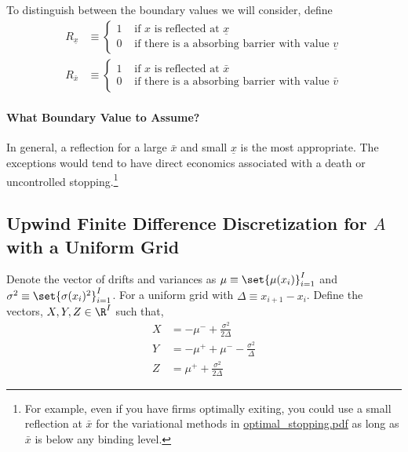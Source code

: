 \documentclass[11pt]{etk-article}
\begin{document}
To distinguish between the boundary values we will consider, define
\begin{align}
	R_{\underline{x}} &\equiv \begin{cases}
		1 & \text{ if $x$ is reflected at $\underline{x}$}\\
		0 & \text{ if there is a absorbing barrier with value $\underline{v}$}
	\end{cases}\label{eq:R-x-min}\\
	R_{\bar{x}} &\equiv \begin{cases}
	1 & \text{ if $x$ is reflected at $\bar{x}$}\\
	0 & \text{ if there is a absorbing barrier with value $\bar{v}$}
\end{cases}\label{eq:R-x-max}
\end{align}	
\paragraph{What Boundary Value to Assume?}
In general, a reflection for a large $\bar{x}$ and small $\underline{x}$ is the most appropriate.  The exceptions would tend to have direct economics associated with a death or uncontrolled stopping.\footnote{For example, even if you have firms optimally exiting, you could use a small reflection at $\bar{x}$ for the variational methods in \url{optimal_stopping.pdf} as long as $\bar{x}$ is below any binding level.}

\subsection{Upwind Finite Difference Discretization for $A$ with a Uniform Grid}\label{sec:upwind-uniform}
Denote the vector of drifts and variances as $\mu \equiv \set{\mu(x_i)}_{i=1}^I$ and $\sigma^2 \equiv \set{\sigma(x_i)^2}_{i=1}^I$.  For a uniform grid with $\Delta \equiv x_{i+1} - x_i$.  Define the vectors, $X,Y,Z \in \R^I$ such that,
\begin{align}
	X &= - \mu^{-}+ \frac{\sigma^{2}}{2 \Delta}\label{eq:X} \\
	Y &= - \mu^{+} + \mu^{-}- \frac{\sigma^{2}}{\Delta}\label{eq:Y} \\
	Z &= \mu^{+} + \frac{\sigma^{2}}{2 \Delta}\label{eq:Z}
\end{align}
\end{document}
